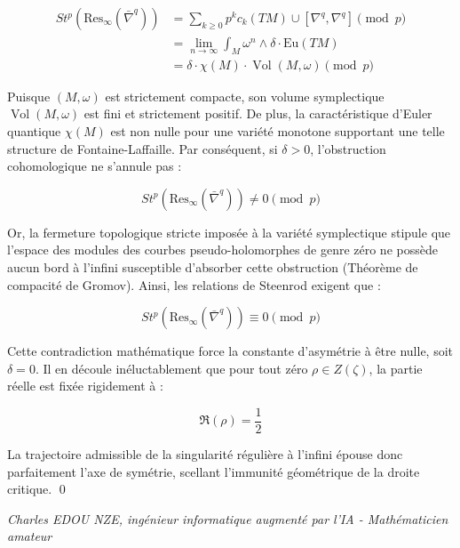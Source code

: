 \documentclass[
]{article}
\begin{document}
\begin{align*}
St^p \left( \text{Res}_\infty(\bar{\nabla}^q) \right) &= \sum_{k \geq 0} p^k c_k(TM) \cup \left[ \nabla^q, \nabla^q \right] \pmod p \\
&= \lim_{n \to \infty} \int_{M} \omega^n \wedge \delta \cdot \text{Eu}(TM) \\
&= \delta \cdot \chi(M) \cdot \operatorname{Vol}(M, \omega) \pmod p
\end{align*}

Puisque $(M, \omega)$ est strictement compacte, son volume symplectique $\operatorname{Vol}(M, \omega)$ est fini et strictement positif. De plus, la caractéristique d'Euler quantique $\chi(M)$ est non nulle pour une variété monotone supportant une telle structure de Fontaine-Laffaille. Par conséquent, si $\delta > 0$, l'obstruction cohomologique ne s'annule pas :

\begin{equation*}
St^p \left( \text{Res}_\infty(\bar{\nabla}^q) \right) \neq 0 \pmod p
\end{equation*}

Or, la fermeture topologique stricte imposée à la variété symplectique stipule que l'espace des modules des courbes pseudo-holomorphes de genre zéro ne possède aucun bord à l'infini susceptible d'absorber cette obstruction (Théorème de compacité de Gromov). Ainsi, les relations de Steenrod exigent que :

\begin{equation*}
St^p \left( \text{Res}_\infty(\bar{\nabla}^q) \right) \equiv 0 \pmod p
\end{equation*}

Cette contradiction mathématique force la constante d'asymétrie à être nulle, soit $\delta = 0$. Il en découle inéluctablement que pour tout zéro $\rho \in Z(\zeta)$, la partie réelle est fixée rigidement à :

\begin{equation*}
\Re(\rho) = \frac{1}{2}
\end{equation*}

La trajectoire admissible de la singularité régulière à l'infini épouse donc parfaitement l'axe de symétrie, scellant l'immunité géométrique de la droite critique. \qed

\vspace{1cm}
\begin{flushright}
\textit{Charles EDOU NZE, ingénieur informatique augmenté par l'IA - Mathématicien amateur}
\end{flushright}
\end{document}
